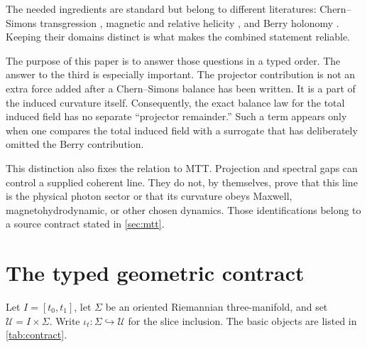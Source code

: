 \documentclass[11pt]{article}
\newcommand{\cU}{\mathcal U}
\begin{document}
The needed ingredients are standard but belong to different literatures:
Chern--Simons transgression \cite{chernsimons1974}, magnetic and relative
helicity \cite{bergerfield1984,mactaggartvalli2023}, and Berry holonomy
\cite{berry1984,simon1983}.  Keeping their domains distinct is what makes the
combined statement reliable.

The purpose of this paper is to answer those questions in a typed order.  The
answer to the third is especially important.  The projector contribution is
not an extra force added after a Chern--Simons balance has been written.  It is a
part of the induced curvature itself.  Consequently, the exact balance law for
the total induced field has no separate ``projector remainder.''  Such a term
appears only when one compares the total induced field with a surrogate that
has deliberately omitted the Berry contribution.

This distinction also fixes the relation to MTT.  Projection and spectral gaps
can control a supplied coherent line.  They do not, by themselves, prove that
this line is the physical photon sector or that its curvature obeys Maxwell,
magnetohydrodynamic, or other chosen dynamics.  Those identifications belong to
a source contract stated in \cref{sec:mtt}.

\section{The typed geometric contract}

Let \(I=[t_0,t_1]\), let \(\Sigma\) be an oriented Riemannian
three-manifold, and set \(\cU=I\times\Sigma\).  Write
\(\iota_t:\Sigma\hookrightarrow\cU\) for the slice inclusion.  The basic
objects are listed in \cref{tab:contract}.
\end{document}
